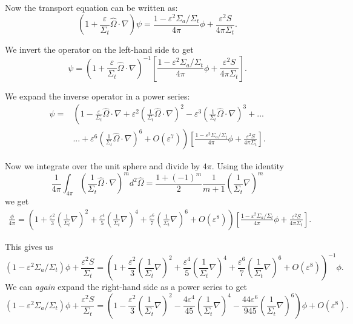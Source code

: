 \documentclass[12pt]{article}
\newcommand{\omvec}{\ensuremath{\hat{\Omega}}}
\newcommand{\ep}{\ensuremath{\varepsilon}}
\begin{document}
Now the transport equation can be written as:
\[
\left(1+\frac{\ep}{\Sigma_t}\omvec\cdot\nabla\right)\psi = \frac{1-\ep^2\Sigma_a/\Sigma_t}{4\pi}\phi+\frac{\ep^2S}{4\pi\Sigma_t}.
\]

We invert the operator on the left-hand side to get
\[
\psi = \left(1+\frac{\ep}{\Sigma_t}\omvec\cdot\nabla\right)^{-1}\left[\frac{1-\ep^2\Sigma_a/\Sigma_t}{4\pi}\phi+\frac{\ep^2S}{4\pi\Sigma_t}\right].
\]

We expand the inverse operator in a power series:
\[
\begin{split}
\psi = &\left(1-\frac{\ep}{\Sigma_t}\omvec\cdot\nabla+\ep^2\left(\frac{1}{\Sigma_t}\omvec\cdot\nabla\right)^2 -  \ep^3\left(\frac{1}{\Sigma_t}\omvec\cdot\nabla\right)^3 + ... \right.\\
& \left. ... + \ep^6\left(\frac{1}{\Sigma_t}\omvec\cdot\nabla\right)^6 +O(\ep^7)\right)\left[\frac{1-\ep^2\Sigma_a/\Sigma_t}{4\pi}\phi+\frac{\ep^2S}{4\pi\Sigma_t}\right].
\end{split}
\]

Now we integrate over the unit sphere and divide by $4\pi$. Using the identity
\[
\frac{1}{4\pi}\int_{4\pi}\left(\frac{1}{\Sigma_t}\omvec\cdot\nabla\right)^m d^2\omvec = \frac{1+(-1)^m}{2}\frac{1}{m+1}\left(\frac{1}{\Sigma_t}\nabla\right)^m
\]
we get
\[
\begin{split}
\frac{\phi}{4\pi} = \left(1+\frac{\ep^2}{3}\left(\frac{1}{\Sigma_t}\nabla\right)^2 + \frac{\ep^4}{5}\left(\frac{1}{\Sigma_t}\nabla\right)^4 + \frac{\ep^6}{7}\left(\frac{1}{\Sigma_t}\nabla\right)^6+O(\ep^8)\right)\left[\frac{1-\ep^2\Sigma_a/\Sigma_t}{4\pi}\phi+\frac{\ep^2S}{4\pi\Sigma_t}\right].
\end{split}
\]

This gives us
\[
(1-\ep^2\Sigma_a/\Sigma_t)\phi+\frac{\ep^2S}{\Sigma_t}=
\left(1+\frac{\ep^2}{3}\left(\frac{1}{\Sigma_t}\nabla\right)^2 + \frac{\ep^4}{5}\left(\frac{1}{\Sigma_t}\nabla\right)^4 + \frac{\ep^6}{7}\left(\frac{1}{\Sigma_t}\nabla\right)^6+O(\ep^8)\right)^{-1}\phi.
\]
We can \emph{again} expand the right-hand side as a power series to get
\[
(1-\ep^2\Sigma_a/\Sigma_t)\phi+\frac{\ep^2S}{\Sigma_t}=
\left(1-\frac{\ep^2}{3}\left(\frac{1}{\Sigma_t}\nabla\right)^2 - \frac{4\ep^4}{45}\left(\frac{1}{\Sigma_t}\nabla\right)^4 - \frac{44\ep^6}{945}\left(\frac{1}{\Sigma_t}\nabla\right)^6\right)\phi +O(\ep^8).
\]
\end{document}
